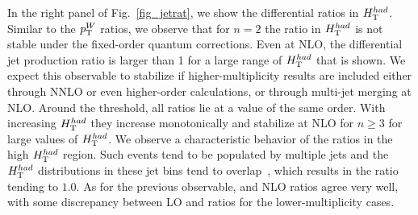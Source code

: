 In the right panel of Fig.~\ref{fig_jetrat}, we show the differential
ratios in $H_{\textrm T}^{had}$. Similar to the $p_{\textrm T}^W$ ratios, we observe that for $n=2$ the ratio in
$H_{\textrm T}^{had}$ is not stable under the fixed-order quantum
corrections. Even at NLO, the differential jet production ratio is
larger than 1 for a large range of $H_{\textrm T}^{had}$ that is shown. We expect this observable to stabilize if higher-multiplicity results are included either
through NNLO or even higher-order calculations, or through multi-jet
merging at NLO. Around the threshold, all ratios lie at a value of the same order.
With increasing $H_{\textrm T}^{had}$ they increase monotonically and
stabilize at NLO for $n\geq 3$ for large values of
$H_{\textrm T}^{had}$. We observe a characteristic
behavior of the ratios in the high $H_{\textrm T}^{had}$ region. Such events tend to be populated by multiple jets and the $H_{\textrm T}^{had}$
distributions in these jet bins tend to overlap~\cite{BH:Wratios}, which results in
the ratio tending to $1.0$. As for the previous observable,
\MINLOp{} and NLO ratios agree very well, with some discrepancy
between LO and \MILOp{} ratios for the lower-multiplicity cases.


